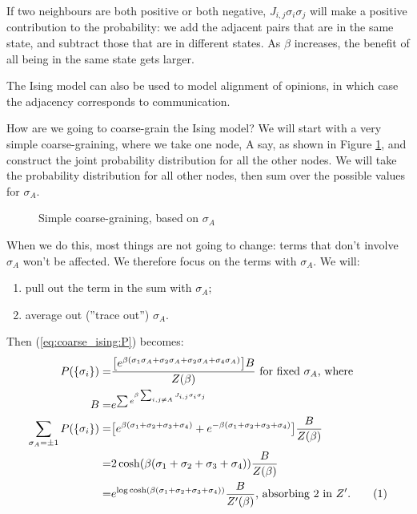 \documentclass[]{article}
\newcommand\numberthis{\addtocounter{equation}{1}\tag{\theequation}}
\begin{document}
If two neighbours are both positive or both negative, $J_{i,j} \sigma_i \sigma_j$ will make a positive contribution to the probability: we add the adjacent pairs that are in the same state, and subtract those that are in different states. As $\beta$ increases, the benefit of all being in the same state gets larger.

The Ising model can also be used to model alignment of opinions, in which case the adjacency corresponds to communication.

How are we going to coarse-grain the Ising model? We will start with a very simple coarse-graining, where we take one node, A say, as shown in Figure \ref{fig:ising-coarse1}, and construct the joint probability distribution for all the other nodes. We will take the probability distribution for all other nodes, then sum over the possible values for $\sigma_A$.

\begin{figure}[H]
	\begin{center}
		\caption{Simple coarse-graining, based on $\sigma_A$}\label{fig:ising-coarse1}
	\end{center}
\end{figure}

When we do this, most things are not going to change: terms that don't involve $\sigma_A$ won't be affected. We therefore focus on the terms with $\sigma_A$. We will:
\begin{enumerate}
	\item pull out the term in the sum with $\sigma_A$;
	\item average out (''trace out'') $\sigma_A$.
\end{enumerate}

Then (\ref{eq:coarse_ising:P}) becomes:
\begin{align*}
	P(\{\sigma_i\}) =& \frac{\big[e^{\beta(\sigma_1\sigma_A + \sigma_2\sigma_A + \sigma_2\sigma_A + \sigma_4\sigma_A)}\big]B}{Z(\beta)} \text{ for fixed $\sigma_A$, where}\\
	B =& e^{\sum e^{\beta \sum_{i,j \ne A} J_{i,j} \sigma_i \sigma_j}}\\
	\sum_{\sigma_A=\pm 1} P(\{\sigma_i\}) =& \big[e^{\beta(\sigma_1+\sigma_2+\sigma_3+\sigma_4)} + e^{-\beta(\sigma_1+\sigma_2+\sigma_3+\sigma_4)}\big]  \frac{B}{Z(\beta)}\\
	=& 2 \cosh({\beta(\sigma_1+\sigma_2+\sigma_3+\sigma_4)})   \frac{B}{Z(\beta)}\\
	=& e^{\log{\cosh({\beta(\sigma_1+\sigma_2+\sigma_3+\sigma_4)})}} \frac{B}{Z^\prime(\beta)} \text{, absorbing $2$ in $Z^{\prime}$.} \numberthis \label{eq:coarse_ising:P2}
\end{align*}
\end{document}
